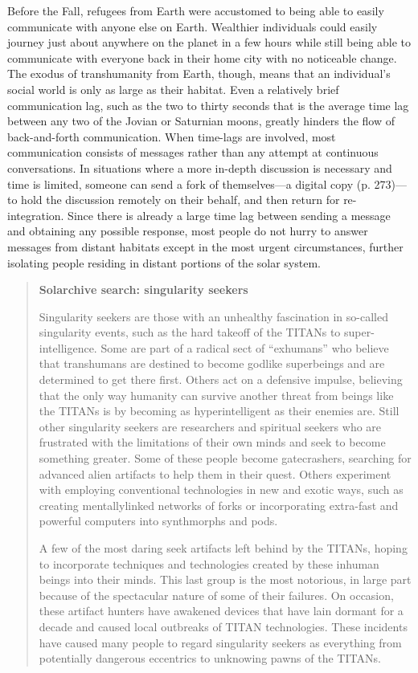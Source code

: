 Before the Fall, refugees from Earth were accustomed to being able to
easily communicate with anyone else on Earth. Wealthier individuals
could easily journey just about anywhere on the planet in a few hours
while still being able to communicate with everyone back in their home
city with no noticeable change. The exodus of transhumanity from
Earth, though, means that an individual's social world is only as
large as their habitat. Even a relatively brief communication lag,
such as the two to thirty seconds that is the average time lag between
any two of the Jovian or Saturnian moons, greatly hinders the flow of
back-and-forth communication. When time-lags are involved, most
communication consists of messages rather than any attempt at
continuous conversations.  In situations where a more in-depth
discussion is necessary and time is limited, someone can send a fork
of themselves—a digital copy (p. 273)—to hold the discussion remotely
on their behalf, and then return for re-integration. Since there is
already a large time lag between sending a message and obtaining any
possible response, most people do not hurry to answer messages from
distant habitats except in the most urgent circumstances, further
isolating people residing in distant portions of the solar system.

\begin{quotation}
  \textbf{Solarchive search: singularity seekers}
  
  Singularity seekers are those with an unhealthy fascination in
  so-called singularity events, such as the hard takeoff of the TITANs
  to super-intelligence.  Some are part of a radical sect of
  “exhumans” who believe that transhumans are destined to become
  godlike superbeings and are determined to get there first. Others
  act on a defensive impulse, believing that the only way humanity can
  survive another threat from beings like the TITANs is by becoming as
  hyperintelligent as their enemies are. Still other singularity
  seekers are researchers and spiritual seekers who are frustrated
  with the limitations of their own minds and seek to become something
  greater.  Some of these people become gatecrashers, searching for
  advanced alien artifacts to help them in their quest.  Others
  experiment with employing conventional technologies in new and
  exotic ways, such as creating mentallylinked networks of forks or
  incorporating extra-fast and powerful computers into synthmorphs and
  pods.

  A few of the most daring seek artifacts left behind by the TITANs,
  hoping to incorporate techniques and technologies created by these
  inhuman beings into their minds. This last group is the most
  notorious, in large part because of the spectacular nature of some
  of their failures. On occasion, these artifact hunters have awakened
  devices that have lain dormant for a decade and caused local
  outbreaks of TITAN technologies. These incidents have caused many
  people to regard singularity seekers as everything from potentially
  dangerous eccentrics to unknowing pawns of the TITANs.
\end{quotation}

